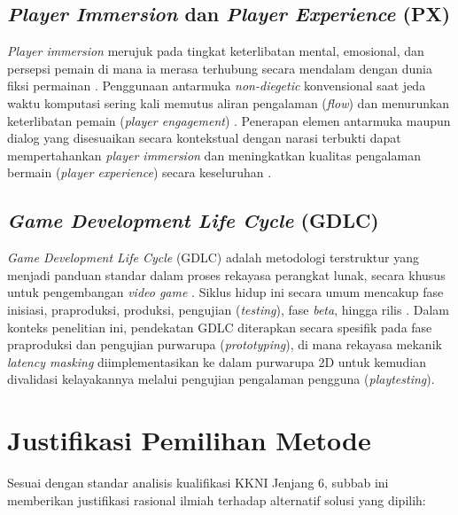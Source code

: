 \subsection{\textit{Player Immersion} dan \textit{Player Experience} (PX)}
\textit{Player immersion} merujuk pada tingkat keterlibatan mental, emosional, dan persepsi pemain di mana ia merasa terhubung secara mendalam dengan dunia fiksi permainan \citep{andersson2024effects, elfleet2024investigating}. Penggunaan antarmuka \textit{non-diegetic} konvensional saat jeda waktu komputasi sering kali memutus aliran pengalaman (\textit{flow}) dan menurunkan keterlibatan pemain (\textit{player engagement}) \citep{csepregi2021effect}. Penerapan elemen antarmuka maupun dialog yang disesuaikan secara kontekstual dengan narasi terbukti dapat mempertahankan \textit{player immersion} dan meningkatkan kualitas pengalaman bermain (\textit{player experience}) secara keseluruhan \citep{andersson2024effects, csepregi2021effect}.

\subsection{\textit{Game Development Life Cycle} (GDLC)}
\textit{Game Development Life Cycle} (GDLC) adalah metodologi terstruktur yang menjadi panduan standar dalam proses rekayasa perangkat lunak, secara khusus untuk pengembangan \textit{video game} \citep{ramadan2013game}. Siklus hidup ini secara umum mencakup fase inisiasi, praproduksi, produksi, pengujian (\textit{testing}), fase \textit{beta}, hingga rilis \citep{ramadan2013game}. Dalam konteks penelitian ini, pendekatan GDLC diterapkan secara spesifik pada fase praproduksi dan pengujian purwarupa (\textit{prototyping}), di mana rekayasa mekanik \textit{latency masking} diimplementasikan ke dalam purwarupa 2D untuk kemudian divalidasi kelayakannya melalui pengujian pengalaman pengguna (\textit{playtesting}).

\section{Justifikasi Pemilihan Metode}

Sesuai dengan standar analisis kualifikasi KKNI Jenjang 6, subbab ini memberikan justifikasi rasional ilmiah terhadap alternatif solusi yang dipilih:

